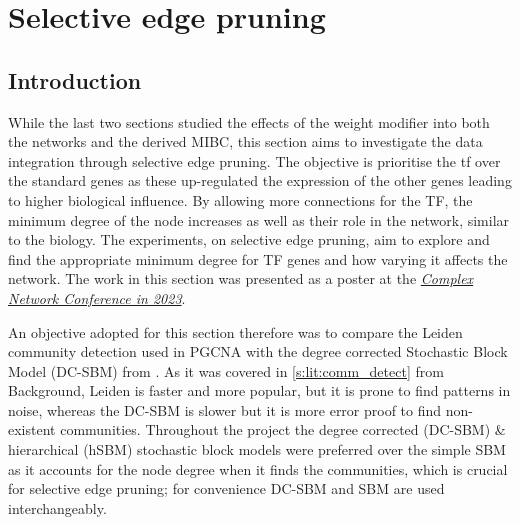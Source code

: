 \chapter{Selective edge pruning} \label{s:N_I:sel_pruning}
\vspace{3mm}
\vspace{3mm}

\section{Introduction}

While the last two sections studied the effects of the weight modifier into both the networks and the derived MIBC, this section aims to investigate the data integration through selective edge pruning. The objective is prioritise the \acrfull{tf} over the standard genes as these up-regulated the expression of the other genes leading to higher biological influence. By allowing more connections for the TF, the minimum degree of the node increases as well as their role in the network, similar to the biology. The experiments, on selective edge pruning, aim to explore and find the appropriate minimum degree for TF genes and how varying it affects the network. The work in this section was presented as a poster at the \textit{\href{https://2023.complexnetworks.org/}{Complex Network Conference in 2023}}.

An objective adopted for this section therefore was to compare the Leiden \citep{Traag2019-ne} community detection used in PGCNA with the degree corrected Stochastic Block Model (DC-SBM) from \citet{Karrer2011-si, Peixoto2017-gc}. As it was covered in \cref{s:lit:comm_detect} from Background, Leiden is faster and more popular, but it is prone to find patterns in noise, whereas the DC-SBM is slower but it is more error proof to find non-existent communities. Throughout the project the degree corrected (DC-SBM) \& hierarchical (hSBM) stochastic block models were preferred over the simple SBM \citep{Holland1983-eu} as it accounts for the node degree when it finds the communities, which is crucial for selective edge pruning; for convenience DC-SBM and SBM are used interchangeably.

